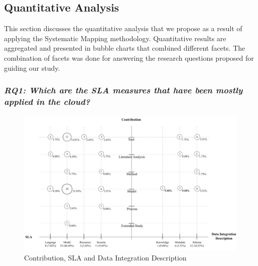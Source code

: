 \subsection{Quantitative Analysis}\label{sec:qanalysis}

This section discusses the quantitative analysis that we propose as a result of applying the Systematic Mapping methodology.
Quantitative results are aggregated and presented in bubble charts that combined different facets. The combination of facets was done for answering the research questions proposed for guiding our study.


 
\subsubsection{\textit{RQ1: Which are the SLA measures that have been mostly
applied  in the cloud?}}
\begin{figure}[h!]
\centering
\includegraphics[scale=0.45]{figs/bubble-charts/Contribution-SLA-DIdescription.pdf} 
\caption{Contribution, SLA and Data Integration Description}\label{fig:facet1}
\end{figure}

